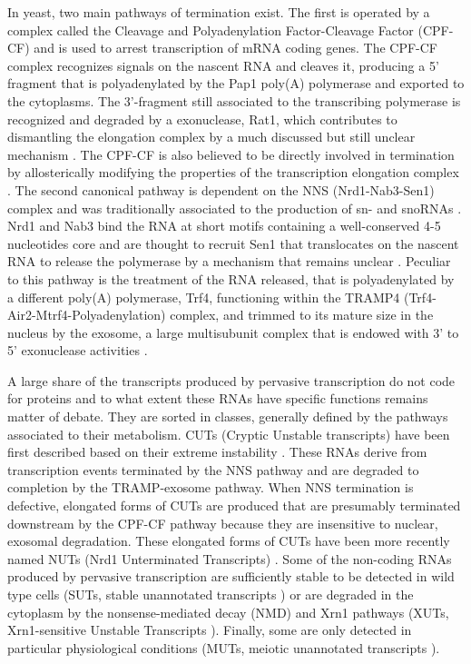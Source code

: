 In yeast, two main pathways of termination exist. The first is operated by a complex called the Cleavage and Polyadenylation Factor-Cleavage Factor (CPF-CF) and is used to arrest transcription of mRNA coding genes. The CPF-CF complex recognizes signals on the nascent RNA and cleaves it, producing a 5’ fragment that is polyadenylated by the Pap1 poly(A) polymerase and exported to the cytoplasms.  The 3’-fragment still associated to the transcribing polymerase is recognized and degraded by a \FtoT{} exonuclease,  Rat1, which contributes to dismantling the elongation complex by a much discussed but still unclear mechanism \cite{kim:2004:yeast}. The CPF-CF is also believed to be directly involved in termination by allosterically modifying the properties of the transcription elongation complex \cite{zhang:2005:ctddependent}. 
The second canonical pathway is dependent on the NNS (Nrd1-Nab3-Sen1) complex and was traditionally associated to the production of sn- and snoRNAs \cite{kim:2006:distinct}. Nrd1 and Nab3 bind the RNA at short motifs containing a well-conserved 4-5 nucleotides core \cite{carroll:2004:identification} and are thought to recruit Sen1 that translocates on the nascent RNA to release the polymerase by a mechanism that remains unclear \cite{porrua:2013:bacteriallike}. Peculiar to this pathway is the treatment of the RNA released, that is polyadenylated by a different poly(A) polymerase, Trf4, functioning within the TRAMP4 (Trf4-Air2-Mtrf4-Polyadenylation) complex, and trimmed to its mature size in the nucleus by the exosome, a large multisubunit complex that is endowed with 3’ to 5’ exonuclease activities \cite{vasiljeva:2006:nrd1}. 

A large share of the transcripts produced by pervasive transcription do not code for proteins and to what extent these RNAs have specific functions remains matter of debate. They are sorted in classes, generally defined by the pathways associated to their metabolism. CUTs (Cryptic Unstable transcripts) have been first described based on their extreme instability \cite{wyers:2005:cryptic}. These RNAs derive from transcription events terminated by the NNS pathway and are degraded to completion by the TRAMP-exosome pathway. When NNS termination is defective, elongated forms of CUTs are produced that are presumably terminated downstream by the CPF-CF pathway because they are insensitive to nuclear, exosomal degradation. These elongated forms of CUTs have been more recently named NUTs (Nrd1 Unterminated Transcripts) \cite{schulz:2013:transcriptome}.  Some of the non-coding RNAs produced by pervasive transcription are sufficiently stable to be detected in wild type cells (SUTs, stable unannotated transcripts \cite{david:2006:highresolution}) or are degraded in the cytoplasm by the nonsense-mediated decay (NMD) and Xrn1 pathways (XUTs, Xrn1-sensitive Unstable Transcripts \cite{vandijk:2011:xuts}). Finally, some are only detected in particular physiological conditions (MUTs,  meiotic unannotated transcripts \cite{lardenois:2011:execution}). 

